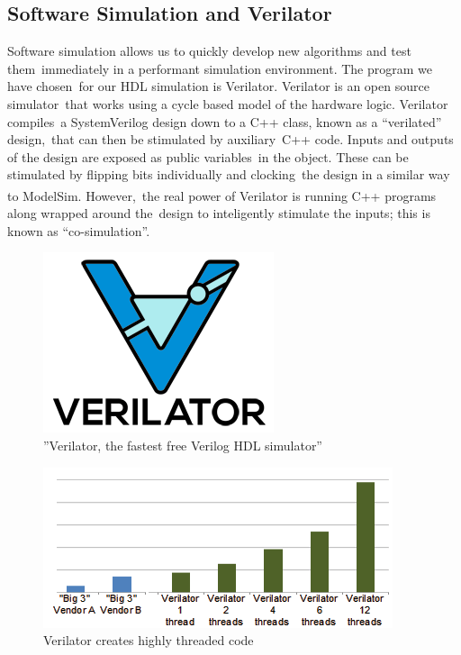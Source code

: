\documentclass{article}
\begin{document}
\subsection{Software Simulation and Verilator}
Software simulation allows us to quickly develop new algorithms and test them\
immediately in a performant simulation environment. The program we have chosen\
for our HDL simulation is Verilator. Verilator is an open source simulator\
that works using a cycle based model of the hardware logic. Verilator compiles\
a SystemVerilog design down to a C++ class, known as a ``verilated'' design,\
that can then be stimulated by auxiliary\
C++ code. Inputs and outputs of the design are exposed as public variables\
in the object. These can be stimulated by flipping bits individually and clocking\
the design in a similar way to ModelSim\textsuperscript{\textregistered}. However,\
the real power of Verilator is running C++ programs along wrapped around the\
design to inteligently stimulate the inputs; this is known as ``co-simulation''.\

\begin{figure}[ht]
	\begin{center}
	\includegraphics[scale=.5]{pictures/verilator.png}
	\caption{''Verilator, the fastest free Verilog HDL simulator'' \cite{veripool}}
	\end{center}
\end{figure}

\begin{figure}[ht]
	\begin{center}
	\includegraphics[scale=.7]{pictures/threads.png}
	\caption{Verilator creates highly threaded code \cite{veripool}}
	\end{center}
\end{figure}
\end{document}
